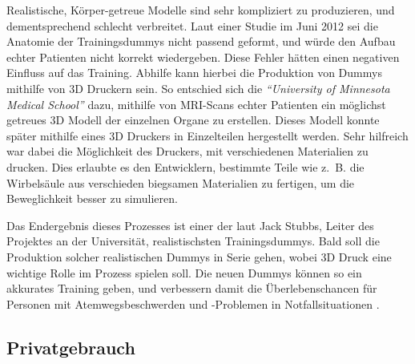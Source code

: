 Realistische, Körper-getreue Modelle sind sehr kompliziert zu produzieren, und dementsprechend schlecht verbreitet. Laut einer Studie im Juni 2012 sei die Anatomie der Trainingsdummys nicht passend geformt, und würde den Aufbau echter Patienten nicht korrekt wiedergeben. Diese Fehler hätten einen negativen Einfluss auf das Training. Abhilfe kann hierbei die Produktion von Dummys mithilfe von 3D Druckern sein. So entschied sich die \emph{\textquotedblleft University of Minnesota Medical School\textquotedblright} dazu, mithilfe von MRI-Scans echter Patienten ein möglichst getreues 3D Modell der einzelnen Organe zu erstellen. Dieses Modell konnte später mithilfe eines 3D Druckers in Einzelteilen hergestellt werden. Sehr hilfreich war dabei die Möglichkeit des Druckers, mit verschiedenen Materialien zu drucken. Dies erlaubte es den Entwicklern, bestimmte Teile wie z.~B. die Wirbelsäule aus verschieden biegsamen Materialien zu fertigen, um die Beweglichkeit besser zu simulieren. 

Das Endergebnis dieses Prozesses ist einer der laut Jack Stubbs, Leiter des Projektes an der Universität, realistischsten Trainingsdummys. Bald soll die Produktion solcher realistischen Dummys in Serie gehen, wobei 3D Druck eine wichtige Rolle im Prozess spielen soll. Die neuen Dummys können so ein akkurates Training geben, und verbessern damit die Überlebenschancen für Personen mit Atemwegsbeschwerden und -Problemen in Notfallsituationen \parencite{DUMMY_STUDY}.


\subsection{Privatgebrauch}